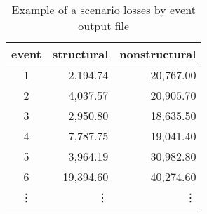 \begin{table}[htbp]
\centering
\begin{tabular}{crr}

\hline
\rowcolor{lightgray}
\bf{event} & \bf{structural} & \bf{nonstructural} \\
\hline
1 & 2,194.74 & 20,767.00 \\
2 & 4,037.57 & 20,905.70 \\
3 & 2,950.80 & 18,635.50 \\
4 & 7,787.75 & 19,041.40 \\
5 & 3,964.19 & 30,982.80 \\
6 & 19,394.60  & 40,274.60 \\
⋮ & ⋮  & ⋮   \\
\hline

\end{tabular}
\caption{Example of a scenario losses by event output file}
\label{output:scenario_loss_event}
\end{table}